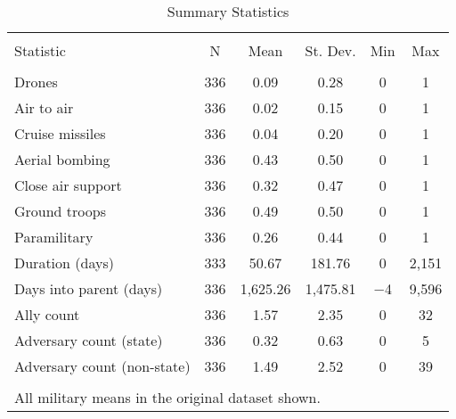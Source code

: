 \documentclass[fleqn,12pt]{article}
\begin{document}
\begin{table}[!htbp] \centering 
  \caption{Summary Statistics} 
  \label{tab:summary-stats} 
\begin{tabular}{@{\extracolsep{5pt}}lccccc} 
\\[-1.8ex]\hline 
\hline \\[-1.8ex] 
Statistic & \multicolumn{1}{c}{N} & \multicolumn{1}{c}{Mean} & \multicolumn{1}{c}{St. Dev.} & \multicolumn{1}{c}{Min} & \multicolumn{1}{c}{Max} \\ 
\hline \\[-1.8ex] 
Drones & 336 & 0.09 & 0.28 & 0 & 1 \\ 
Air to air & 336 & 0.02 & 0.15 & 0 & 1 \\ 
Cruise missiles & 336 & 0.04 & 0.20 & 0 & 1 \\ 
Aerial bombing & 336 & 0.43 & 0.50 & 0 & 1 \\ 
Close air support & 336 & 0.32 & 0.47 & 0 & 1 \\ 
Ground troops & 336 & 0.49 & 0.50 & 0 & 1 \\ 
Paramilitary & 336 & 0.26 & 0.44 & 0 & 1 \\ 
Duration (days) & 333 & 50.67 & 181.76 & 0 & 2,151 \\ 
Days into parent (days) & 336 & 1,625.26 & 1,475.81 & $-$4 & 9,596 \\ 
Ally count & 336 & 1.57 & 2.35 & 0 & 32 \\ 
Adversary count (state) & 336 & 0.32 & 0.63 & 0 & 5 \\ 
Adversary count (non-state) & 336 & 1.49 & 2.52 & 0 & 39 \\ 
\hline \\[-1.8ex] 
\multicolumn{6}{l}{All military means in the original dataset shown.} \\ 
\end{tabular} 
\end{table}


\end{document}
